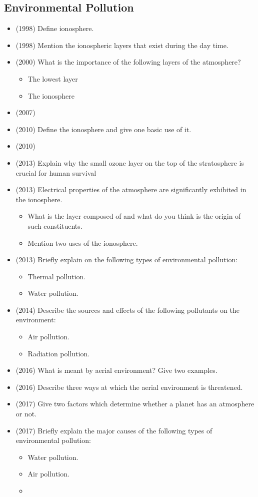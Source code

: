 \documentclass{article}
\begin{document}
\subsection{Environmental Pollution}
\begin{itemize}
\item (1998)  Define ionosphere.
\item (1998)  Mention the ionospheric layers that exist during the day time.
\item (2000)  What is the importance of the following layers of the atmosphere?\begin{itemize}
\item The lowest layer
\item The ionosphere
\end{itemize}
\item (2007)  \item (2010)  Define the ionosphere and give one basic use of it.
\item (2010)  \item (2013)  Explain why the small ozone layer on the top of the stratosphere is crucial for human survival
\item (2013)  Electrical properties of the atmosphere are significantly exhibited in the ionosphere.\begin{itemize}
\item  What is the layer composed of and what do you think is the origin of such constituents.
\item  Mention two uses of the ionosphere.
\end{itemize}
\item (2013)  Briefly explain on the following types of environmental pollution:\begin{itemize}
\item  Thermal pollution.
\item  Water pollution.
\end{itemize}
\item (2014)  Describe the sources and effects of the following pollutants on the environment:\begin{itemize}
\item Air pollution. 
\item Radiation pollution.
\end{itemize}
\item (2016)  What is meant by aerial environment?  Give two examples.
\item (2016)  Describe three ways at which the aerial environment is threatened.
\item (2017)  Give two factors which determine whether a planet has an atmosphere or not.
\item (2017)  Briefly explain the major causes of the following types of environmental pollution:\begin{itemize}
\item Water pollution. 
\item  Air pollution.
\item 
\end{itemize}

\end{itemize}
\end{document}
